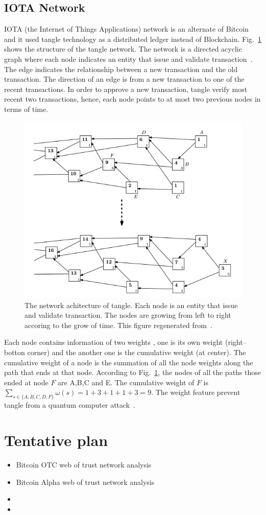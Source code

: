 \documentclass[onecolumn, 12pt]{IEEEtran}
\begin{document}
\subsection{IOTA Network}
IOTA (the Internet of Things Applications) network is an alternate of Bitcoin and it used tangle technology as a distributed ledger instead of Blockchain.
Fig.~\ref{fig:tangle} shows the structure of the tangle network. The network is
a directed acyclic graph where each node indicates an entity that issue and
validate transaction~\cite{popov2016tangle}. The edge indicates the relationship
between a new transaction and the old transaction. The direction of an edge is
from a new transaction to one of the recent transactions. In order to approve a
new transaction, tangle verify most recent two transactions, hence, each node
points to at most two previous nodes in terms of time.
\begin{figure}[htbp]
\centerline{\includegraphics[width=\columnwidth]{tangle.png}}
\caption{The network achitecture of tangle. Each node is an entity that issue and validate transaction.
The nodes are growing from left to right accoring to the grow of time.
This figure regenerated from~\cite{popov2016tangle}.
}
\label{fig:tangle}
\end{figure}

Each node contains information of two weights , one is its own weight (right--botton corner)
and the another one is the cumulative weight (at center). The cumulative
weight of a node is the summation of all the node weights along the path that ends at
that node. According to Fig.~\ref{fig:tangle}, the nodes of all the paths those ended at node $F$ are
A,B,C and E. The cumulative weight of $F$ is
$\sum_{s\in\{A,B,C,D,F\}}{\omega(s)} = 1 + 3 + 1 + 1 + 3=9$. The weight feature
prevent tangle from a quantum computer attack~\cite{popov2016tangle}.

\section{Tentative plan}
\begin{itemize}
 \item  Bitcoin OTC web of trust network analysis
 \item  Bitcoin Alpha web of trust network analysis
 \item
 \item
\end{itemize}

%



\end{document}
